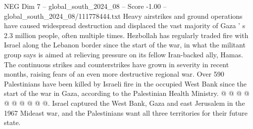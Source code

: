 \begin{textsample}{NEG Dim 7 – global\_south\_2024\_08 – Score -1.00 – global\_south\_2024\_08/111778444.txt}
Heavy airstrikes and ground operations have caused widespread destruction and displaced the vast majority of Gaza ' s 2.3 million people, often multiple times.
Hezbollah has regularly traded fire with Israel along the Lebanon border since the start of the war, in what the militant group says is aimed at relieving pressure on its fellow Iran-backed ally, Hamas.
The continuous strikes and counterstrikes have grown in severity in recent months, raising fears of an even more destructive regional war.
Over 590 Palestinians have been killed by Israeli fire in the occupied West Bank since the start of the war in Gaza, according to the Palestinian Health Ministry. @ @ @ @ @ @ @ @ @ @.
Israel captured the West Bank, Gaza and east Jerusalem in the 1967 Mideast war, and the Palestinians want all three territories for their future state.

\end{textsample}
